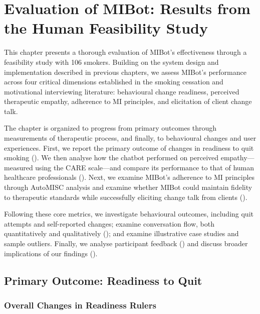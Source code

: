 \chapter{Evaluation of MIBot: Results from the Human Feasibility Study}
\label{ch:mibot-eval}

This chapter presents a thorough evaluation of MIBot's effectiveness through a feasibility study with 106 smokers. Building on the system design and implementation described in previous chapters, we assess MIBot's performance across four critical dimensions established in the smoking cessation and motivational interviewing literature: behavioural change readiness, perceived therapeutic empathy, adherence to MI principles, and elicitation of client change talk.

The chapter is organized to progress from primary outcomes through measurements of therapeutic process, and finally, to behavioural changes and user experiences. First, we report the primary outcome of changes in readiness to quit smoking (). We then analyse how the chatbot performed on perceived empathy—measured using the CARE scale—and compare its performance to that of human healthcare professionals (). Next, we examine MIBot's adherence to MI principles through AutoMISC analysis and examine whether MIBot could maintain fidelity to therapeutic standards while successfully eliciting change talk from clients ().

Following these core metrics, we investigate behavioural outcomes, including quit attempts and self-reported changes; examine conversation flow, both quantitatively and qualitatively (); and examine illustrative case studies and sample outliers. Finally, we analyse participant feedback () and discuss broader implications of our findings ().

\section{Primary Outcome: Readiness to Quit}
\label{sec:primary-outcome}

\subsection*{Overall Changes in Readiness Rulers}

